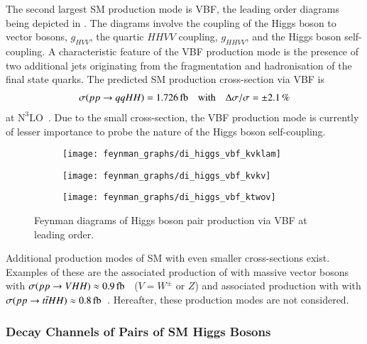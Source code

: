 The second largest SM \HH production mode is VBF, the leading order diagrams
being depicted in . The diagrams involve the coupling
of the Higgs boson to vector bosons, $g_{HVV}$, the quartic $HHVV$ coupling,
$g_{HHVV}$, and the Higgs boson self-coupling. A characteristic feature of the
VBF production mode is the presence of two additional jets originating from the
fragmentation and hadronisation of the final state quarks. The predicted SM \HH
production cross-section via VBF is
\begin{align*}
  \sigma(\pp \to qqHH) = \SI{1.726}{\femto\barn}
  \quad \text{with} \quad
  \Delta \sigma / \sigma = \pm 2.1\,\%
\end{align*}
at $\text{N}^3\text{LO}$~\cite{Dreyer:2018qbw,LHCHWGHH}. Due to the small
cross-section, the VBF production mode is currently of lesser importance to
probe the nature of the Higgs boson self-coupling.

\begin{figure}[htbp]
  \centering

  \begin{subfigure}{0.33\textwidth}
    \centering
    \texttt{[image: feynman\_graphs/di\_higgs\_vbf\_kvklam]}
    \subcaption{}
  \end{subfigure}\hfill%
  \begin{subfigure}{0.33\textwidth}
    \centering
    \texttt{[image: feynman\_graphs/di\_higgs\_vbf\_kvkv]}
    \subcaption{}
  \end{subfigure}\hfill%
  \begin{subfigure}{0.33\textwidth}
    \centering
    \texttt{[image: feynman\_graphs/di\_higgs\_vbf\_ktwov]}
    \subcaption{}
  \end{subfigure}

  \caption{Feynman diagrams of Higgs boson pair production via VBF at leading
    order.}%
  \label{fig:dihiggs_vbf_feyn}
\end{figure}

Additional production modes of SM \HH with even smaller cross-sections
exist. Examples of these are the associated production of \HH with massive
vector bosons with
$\sigma(\pp \to VHH) \approx \SI{0.9}{\femto\barn}$~\cite{deFlorian:2016spz}
($V = W^\pm$ or $Z$) and associated production with \ttbar with
$\sigma(\pp \to \ttbar HH) \approx
\SI{0.8}{\femto\barn}$~\cite{deFlorian:2016spz}. Hereafter, these production
modes are not considered.


\subsubsection{Decay Channels of Pairs of SM Higgs Bosons}%

